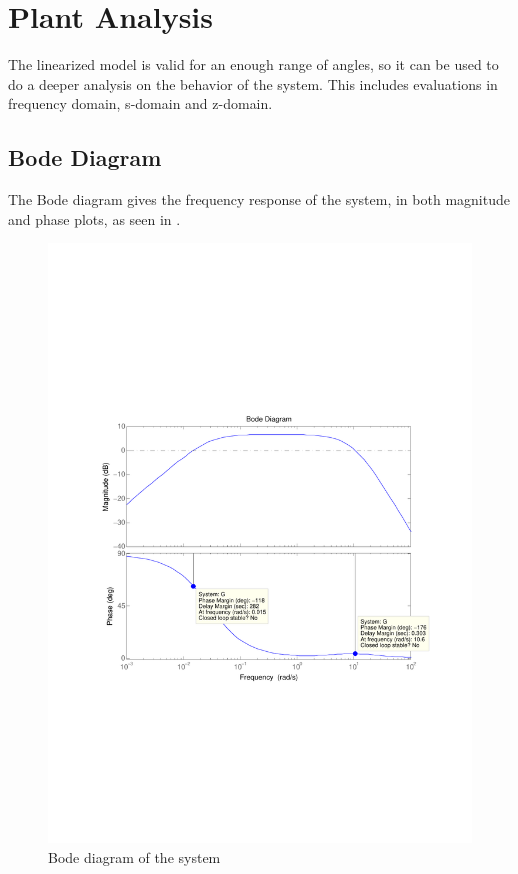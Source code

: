 \section{Plant Analysis}
The linearized model is valid for an enough range of angles, so it can be used to do a deeper analysis on the behavior of the system. This includes evaluations in frequency domain, s-domain and z-domain.

\subsection{Bode Diagram}
The Bode diagram gives the frequency response of the system, in both magnitude and phase plots, as seen in .
\begin{figure}[H] 
	\centering 
	\includegraphics[scale=0.65]{figures/bodeTF}
	\centering
	\captionsetup{justification=centering}	
	\caption{Bode diagram of the system}
	\label{bodeTF}
\end{figure} 

